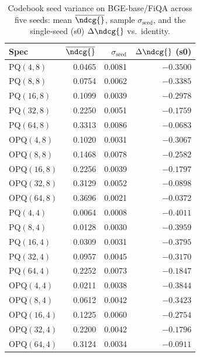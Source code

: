 \begin{table}[t]
\centering
\small
\caption{Codebook seed variance on BGE-base/FiQA across five seeds: mean $\overline{\ndcg{}}$, sample $\sigma_{\text{seed}}$, and the single-seed (s0) $\Delta\ndcg{}$ vs.\ identity.}
\label{tab:seed-variance-bge-base-fiqa}
\begin{tabular}{lrrr}
\toprule
Spec & $\overline{\ndcg{}}$ & $\sigma_{\text{seed}}$ & $\Delta\ndcg{}$ (s0) \\
\midrule
PQ$(4,8)$ & 0.0465 & 0.0081 & $-0.3500$ \\
PQ$(8,8)$ & 0.0754 & 0.0062 & $-0.3385$ \\
PQ$(16,8)$ & 0.1099 & 0.0039 & $-0.2978$ \\
PQ$(32,8)$ & 0.2250 & 0.0051 & $-0.1759$ \\
PQ$(64,8)$ & 0.3313 & 0.0086 & $-0.0683$ \\
OPQ$(4,8)$ & 0.1020 & 0.0031 & $-0.3067$ \\
OPQ$(8,8)$ & 0.1468 & 0.0078 & $-0.2582$ \\
OPQ$(16,8)$ & 0.2256 & 0.0039 & $-0.1797$ \\
OPQ$(32,8)$ & 0.3129 & 0.0052 & $-0.0898$ \\
OPQ$(64,8)$ & 0.3696 & 0.0021 & $-0.0372$ \\
PQ$(4,4)$ & 0.0064 & 0.0008 & $-0.4011$ \\
PQ$(8,4)$ & 0.0128 & 0.0030 & $-0.3959$ \\
PQ$(16,4)$ & 0.0309 & 0.0031 & $-0.3795$ \\
PQ$(32,4)$ & 0.0957 & 0.0045 & $-0.3170$ \\
PQ$(64,4)$ & 0.2252 & 0.0073 & $-0.1847$ \\
OPQ$(4,4)$ & 0.0211 & 0.0038 & $-0.3844$ \\
OPQ$(8,4)$ & 0.0612 & 0.0042 & $-0.3423$ \\
OPQ$(16,4)$ & 0.1225 & 0.0060 & $-0.2754$ \\
OPQ$(32,4)$ & 0.2200 & 0.0042 & $-0.1796$ \\
OPQ$(64,4)$ & 0.3124 & 0.0034 & $-0.0911$ \\
\bottomrule
\end{tabular}
\end{table}

